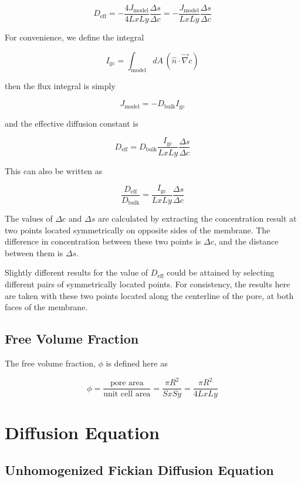 \documentclass{article}
\begin{document}
$$D_{\text{eff}} = - \frac{4 J_{\text{model}}}{4 Lx Ly} \frac{\Delta s}{\Delta c}
 = - \frac{J_{\text{model}}}{Lx Ly} \frac{\Delta s}{\Delta c}$$

For convenience, we define the integral

$$I_{\text{gc}} = \int_{\text{model}} dA\, \left(\hat{n} \cdot \vec{\nabla} c \right)$$

then the flux integral is simply

$$J_{\text{model}} = - D_{\text{bulk}} I_\text{gc}$$

and the effective diffusion constant is

$$D_{\text{eff}} = D_{\text{bulk}} \frac{I_\text{gc}}{Lx Ly} \frac{\Delta s}{\Delta c}$$

This can also be written as

$$\frac{D_{\text{eff}}}{D_{\text{bulk}}} = \frac{I_\text{gc}}{Lx Ly} \frac{\Delta s}{\Delta c}$$

The values of $\Delta c$ and $\Delta s$ are calculated by extracting
the concentration result at two points located symmetrically on opposite sides of the membrane.
The difference in concentration between these two points is $\Delta c$,
and the distance between them is $\Delta s$.

Slightly different results for the value of $D_{\text{eff}}$ could be attained by selecting different
pairs of symmetrically located points.
For consistency, the results here are taken with these two points located
along the centerline of the pore, at both faces of the membrane.

\subsection{Free Volume Fraction}\label{subsec:volfrac}

The free volume fraction, $\phi$ is defined here as

$$\phi = \frac{\text{pore area}}{\text{unit cell area}}
= \frac{\pi R^2}{Sx Sy} = \frac{\pi R^2}{4 Lx Ly}$$

\section{Diffusion Equation}\label{sec:equation}

\subsection{Unhomogenized Fickian Diffusion Equation}\label{subsec:unhom_fick}
\end{document}
